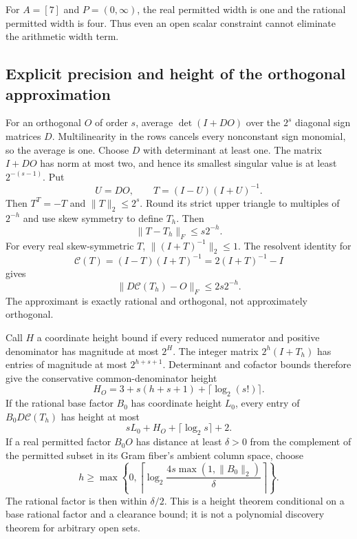 For $A=[7]$ and $P=(0,\infty)$, the real permitted width is one and the rational permitted width is four. Thus even an open scalar constraint cannot eliminate the arithmetic width term.

\subsection{Explicit precision and height of the orthogonal approximation}
For an orthogonal $O$ of order $s$, average $\det(I+DO)$ over the $2^s$ diagonal sign matrices $D$. Multilinearity in the rows cancels every nonconstant sign monomial, so the average is one. Choose $D$ with determinant at least one. The matrix $I+DO$ has norm at most two, and hence its smallest singular value is at least $2^{-(s-1)}$. Put
\[
 U=DO,\qquad T=(I-U)(I+U)^{-1}.
\]
Then $T^T=-T$ and $\|T\|_2\leq2^s$. Round its strict upper triangle to multiples of $2^{-h}$ and use skew symmetry to define $T_h$. Then
\[
 \|T-T_h\|_F\leq s2^{-h}.
\]
For every real skew-symmetric $T$, $\|(I+T)^{-1}\|_2\leq1$. The resolvent identity for
\[
 \mathcal C(T)=(I-T)(I+T)^{-1}=2(I+T)^{-1}-I
\]
gives
\[
 \|D\mathcal C(T_h)-O\|_F\leq2s2^{-h}.
\]
The approximant is exactly rational and orthogonal, not approximately orthogonal.

Call $H$ a coordinate height bound if every reduced numerator and positive denominator has magnitude at most $2^H$. The integer matrix $2^h(I+T_h)$ has entries of magnitude at most $2^{h+s+1}$. Determinant and cofactor bounds therefore give the conservative common-denominator height
\[
 H_O=3+s(h+s+1)+\lceil\log_2(s!)\rceil.
\]
If the rational base factor $B_0$ has coordinate height $L_0$, every entry of $B_0D\mathcal C(T_h)$ has height at most
\[
 sL_0+H_O+\lceil\log_2 s\rceil+2.
\]
If a real permitted factor $B_0O$ has distance at least $\delta>0$ from the complement of the permitted subset in its Gram fiber's ambient column space, choose
\[
 h\geq\max\left\{0,\left\lceil\log_2\frac{4s\max(1,\|B_0\|_2)}{\delta}\right\rceil\right\}.
\]
The rational factor is then within $\delta/2$. This is a height theorem conditional on a base rational factor and a clearance bound; it is not a polynomial discovery theorem for arbitrary open sets.

